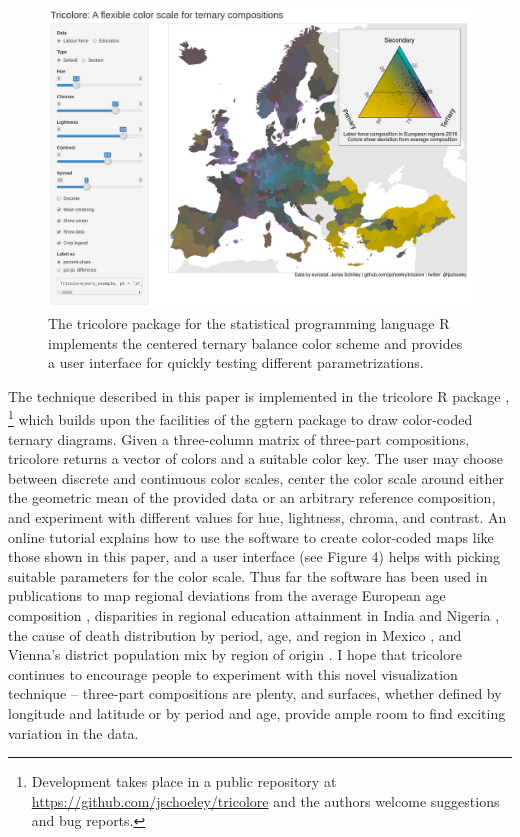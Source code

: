 \documentclass[10pt,twoside,reqno]{article}
\makeatletter
\def\cnstmaxfigwidth{
      \ifdim \Gin@nat@width>\linewidth
        \linewidth
      \else \Gin@nat@width
      \fi
    }
\let\Oldincludegraphics\includegraphics
\renewcommand{\includegraphics}[1]{\Oldincludegraphics[width=\cnstmaxfigwidth]{#1}}
\let\oldfootnote\footnote
\renewcommand\footnote[1]{%
\oldfootnote{\hspace{0.6mm}#1}}
\makeatother
\begin{document}
\begin{figure}
\centering
\includegraphics{figure4.png}
\caption{The tricolore package for the statistical programming language
R implements the centered ternary balance color scheme and provides a
user interface for quickly testing different parametrizations.}
\end{figure}

The technique described in this paper is implemented in the tricolore R
package \citep{Schoeley2019a},\footnote{Development takes place in a
  public repository at \url{https://github.com/jschoeley/tricolore} and
  the authors welcome suggestions and bug reports.} which builds upon
the facilities of the ggtern package \citep{Hamilton2018} to draw
color-coded ternary diagrams. Given a three-column matrix of three-part
compositions, tricolore returns a vector of colors and a suitable color
key. The user may choose between discrete and continuous color scales,
center the color scale around either the geometric mean of the provided
data or an arbitrary reference composition, and experiment with
different values for hue, lightness, chroma, and contrast. An online
tutorial \citep{Schoeley2019b} explains how to use the software to
create color-coded maps like those shown in this paper, and a user
interface (see Figure 4) helps with picking suitable parameters for the
color scale. Thus far the software has been used in publications to map
regional deviations from the average European age composition
\citep{Kashnitsky2018, Schoeley2019}, disparities in regional education
attainment in India and Nigeria \citep{Graetz2019}, the cause of death
distribution by period, age, and region in Mexico
\citep{Kashnitsky2019}, and Vienna's district population mix by region
of origin \citep{StadtWien2019}. I hope that tricolore continues to
encourage people to experiment with this novel visualization technique
-- three-part compositions are plenty, and surfaces, whether defined by
longitude and latitude or by period and age, provide ample room to find
exciting variation in the data.
\end{document}
